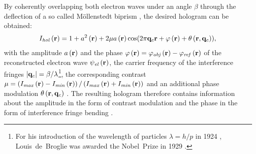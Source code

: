 By coherently overlapping both electron waves under an angle $\beta$ through the deflection of a so called Möllenstedt biprism \cite{Moellenstedt1956}, the desired hologram can be obtained:
\begin{equation}
	I_{\mathit{hol}}\left(\vb{r}\right) = 1 + a^2\left(\vb{r}\right) + 2\mu a\left(\vb{r}\right)\cos(2\pi \vb{q}_c\vb{r} + \varphi\left(\vb{r}\right) + \theta\left(\vb{r},\vb{q}_c\right)),
\end{equation}
with the amplitude $a\left(\vb{r}\right)$ and the phase $\varphi\left(\vb{r}\right) = {\varphi}_{\mathit{obj}}\left(\vb{r}\right) - {\varphi}_{\mathit{ref}}\left(\vb{r}\right)$ of the reconstructed electron wave ${\psi}_{\mathit{el}}\left(\vb{r}\right)$, the carrier frequency of the interference fringes $\abs{\vb{q}_c} = {\beta}/{\lambda}$\footnote{For his introduction of the wavelength of particles $\lambda = h / p$ in 1924 \cite{BrogliePhD1924}, Louis~de~Broglie was awarded the Nobel~Prize in 1929 \cite{Broglie1929}.}, the corresponding contrast $\mu = \left(I_{\mathit{max}}\left(\vb{r}\right) - I_{\mathit{min}}\left(\vb{r}\right)\right) / \left(I_{\mathit{max}}\left(\vb{r}\right) + I_{\mathit{min}}\left(\vb{r}\right)\right)$ \cite{Voelkl1999,Lehmann2002,Lichte2008} and an additional phase modulation $\theta\left(\vb{r}, \vb{q}_c\right)$ \cite{LehmannPhD1997}. The resulting hologram therefore contains information about the amplitude in the form of contrast modulation and the phase in the form of interference fringe bending \cite{Voelkl1999,Lehmann2002,Lichte2008}.

